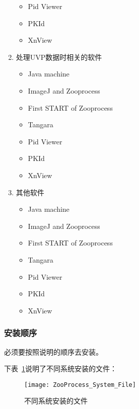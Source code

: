 \begin{enumerate}
\begin{itemize}
					\item Pid Viewer
					\item PKId
					\item	XnView
				\end{itemize}
			\item 处理UVP数据时相关的软件
				\begin{itemize}
					\item Java machine
					\item ImageJ and Zooprocess 
					\item First START of Zooprocess
					\item Tangara
					\item	Pid Viewer
					\item PKId
					\item XnView
				\end{itemize}
			\item 其他软件
				\begin{itemize}
					\item Java machine
					\item ImageJ and Zooprocess
					\item First START of Zooprocess
					\item Tangara
					\item	Pid Viewer
					\item PKId
					\item XnView
				\end{itemize}
		\end{enumerate}
	\subsubsection{安装顺序}
		必须要按照说明的顺序去安装。
	
		下表~\ref{fig:systemfile}说明了不同系统安装的文件： 
		\begin{figure}[!ht]
    		\centering
    		\texttt{[image: ZooProcess\_System\_File]}
    		\caption{不同系统安装的文件}
    		\label{fig:systemfile}
    		\end{figure}
		
